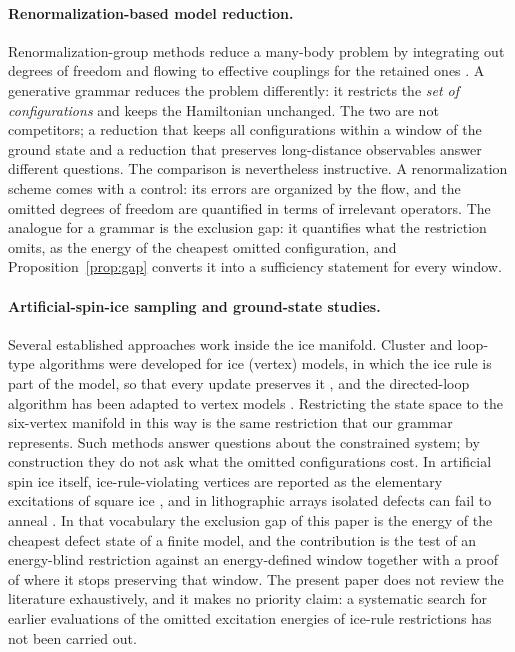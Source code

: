 \documentclass[11pt,a4paper]{article}
\theoremstyle{plain}
\theoremstyle{definition}
\theoremstyle{remark}
\begin{document}
\paragraph{Renormalization-based model reduction.}
Renormalization-group methods reduce a many-body problem by integrating out degrees of freedom and flowing to effective couplings for the retained ones \cite{Wilson1975}. A generative grammar reduces the problem differently: it restricts the \emph{set of configurations} and keeps the Hamiltonian unchanged. The two are not competitors; a reduction that keeps all configurations within a window of the ground state and a reduction that preserves long-distance observables answer different questions. The comparison is nevertheless instructive. A renormalization scheme comes with a control: its errors are organized by the flow, and the omitted degrees of freedom are quantified in terms of irrelevant operators. The analogue for a grammar is the exclusion gap: it quantifies what the restriction omits, as the energy of the cheapest omitted configuration, and Proposition~\ref{prop:gap} converts it into a sufficiency statement for every window.

\paragraph{Artificial-spin-ice sampling and ground-state studies.}
Several established approaches work inside the ice manifold. Cluster and loop-type algorithms were developed for ice (vertex) models, in which the ice rule is part of the model, so that every update preserves it \cite{BarkemaNewman1998}, and the directed-loop algorithm has been adapted to vertex models \cite{SyljuasenZvonarev2004}. Restricting the state space to the six-vertex manifold in this way is the same restriction that our grammar represents. Such methods answer questions about the constrained system; by construction they do not ask what the omitted configurations cost. In artificial spin ice itself, ice-rule-violating vertices are reported as the elementary excitations of square ice \cite{Morgan2011}, and in lithographic arrays isolated defects can fail to anneal \cite{MollerMoessner2006}. In that vocabulary the exclusion gap of this paper is the energy of the cheapest defect state of a finite model, and the contribution is the test of an energy-blind restriction against an energy-defined window together with a proof of where it stops preserving that window. The present paper does not review the literature exhaustively, and it makes no priority claim: a systematic search for earlier evaluations of the omitted excitation energies of ice-rule restrictions has not been carried out.
\end{document}

